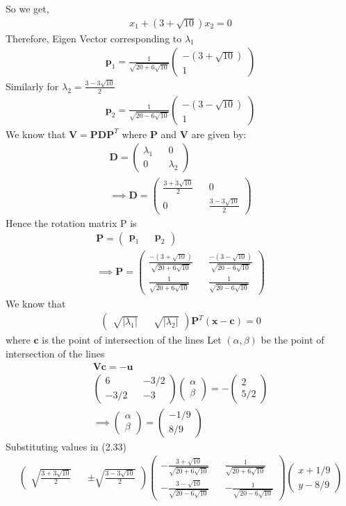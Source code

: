 \documentclass[journal,13pt,twocolumn]{IEEEtran}
\newcommand{\myvec}[1]{\ensuremath{\begin{pmatrix}#1\end{pmatrix}}}
\renewcommand{\vec}[1]{\mathbf{#1}}
\begin{document}
So we get,
\begin{align}
x_1 + (3+\sqrt{10})x_2 = 0
\end{align}
Therefore, Eigen Vector corresponding to $\lambda_1$
\begin{align}
\vec{p}_1 =\frac{1}{\sqrt{20+6\sqrt{10}}} \myvec{-(3+\sqrt{10}) \\ 1}
\end{align}
Similarly for $\lambda_2 = \frac{3-3\sqrt{10}}{2}$
\begin{align}
\vec{p}_2 =\frac{1}{\sqrt{20-6\sqrt{10}}} \myvec{-(3-\sqrt{10}) \\ 1}
\end{align}
We know that $\vec{V} = \vec{P}\vec{D}\vec{P}^T$ where $\vec{P}$ and $\vec{V}$ are given by:
\begin{align}
\vec{D} = \myvec{\lambda_1 && 0\\ 0 && \lambda_2}\\
\implies \vec{D} = \myvec{\frac{3+3\sqrt{10}}{2} && 0\\ 0 &&\frac{3-3\sqrt{10}}{2} }
\end{align}
Hence the rotation matrix P is
\begin{align}
\vec{P} = \myvec{\vec{p}_1 && \vec{p}_2}\\
\implies \vec{P} = \myvec{\frac{-(3+\sqrt{10})}{\sqrt{20+6\sqrt{10}}} && \frac{-(3-\sqrt{10})}{\sqrt{20-6\sqrt{10}}} \\ \frac{1}{\sqrt{20+6\sqrt{10}}} && \frac{1}{\sqrt{20-6\sqrt{10}}}}
\end{align}
We know that 
\begin{align}
\myvec{\sqrt{|\lambda_1|} && \sqrt{|\lambda_2|}}\vec{P}^T(\vec{x}-\vec{c}) = 0
\end{align}
where $\vec{c}$ is the point of intersection of the lines 
Let $(\alpha,\beta)$ be the point of intersection of the lines 
\begin{align}
\vec{V}\vec{c} = -\vec{u}\\
\myvec{6 && -3/2\\-3/2 && -3} \myvec{\alpha \\ \beta} = -\myvec{2 \\ 5/2}\\
\implies \myvec{\alpha \\ \beta} = \myvec{-1/9 \\ 8/9}
\end{align}
Substituting values in (2.33)
\begin{align}
\myvec{ \sqrt{\frac{3+3\sqrt{10}}{2}} && \pm\sqrt{\frac{3-3\sqrt{10}}{2}}} 
\myvec{ -\frac{3+\sqrt{10}}{\sqrt{20+6\sqrt{10}}} && \frac{1}{\sqrt{20+6\sqrt{10}}} \\ -\frac{3-\sqrt{10}}{\sqrt{20-6\sqrt{10}}} && -\frac{1}{\sqrt{20-6\sqrt{10}}}} 
\myvec{x+1/9 \\ y-8/9}
\end{align}
\end{document}
